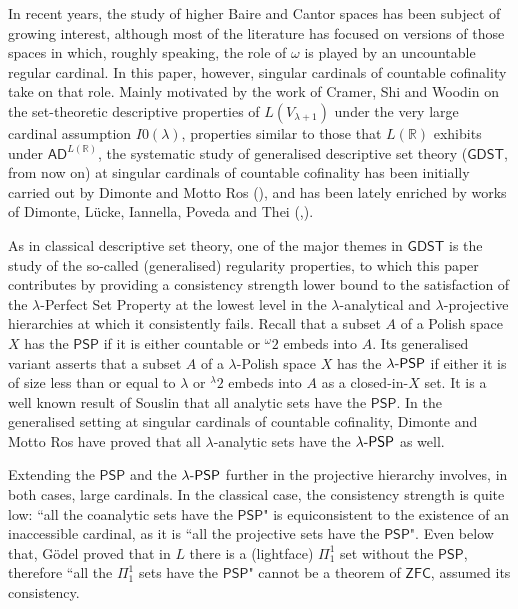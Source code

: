 \documentclass{amsart}
\numberwithin{equation}{section}
\def\hyp{{\hbox{-}}}
\theoremstyle{definition}
\theoremstyle{remark}
\begin{document}
    In recent years, the study of higher Baire and Cantor spaces has been subject of growing interest, although most of the literature has focused on versions of those spaces in which, roughly speaking, the role of $\omega$ is played by an uncountable regular cardinal. In this paper, however, singular cardinals of countable cofinality take on that role. Mainly motivated by the work of Cramer, Shi and Woodin on the set-theoretic descriptive properties of $L(V_{\lambda+1})$ under the very large cardinal assumption $I0(\lambda)$, properties similar to those that $L(\mathbb{R})$ exhibits under $\mathsf{AD}^{L(\mathbb{R})}$, the systematic study of generalised descriptive set theory ($\mathsf{GDST}$, from now on) at singular cardinals of countable cofinality has been initially carried out by Dimonte and Motto Ros (\cite{DMR}), and has been lately enriched by works of Dimonte, Lücke, Iannella, Poveda and Thei (\cite{dimonte2023descriptive},\cite{dimonte2024baire}). 
    
    As in classical descriptive set theory, one of the major themes in $\mathsf{GDST}$ is the study of the so-called (generalised) regularity properties, to which this paper contributes by providing a consistency strength lower bound to the satisfaction of the $\lambda$-Perfect Set Property at the lowest level in the $\lambda$-analytical and $\lambda$-projective hierarchies at which it consistently fails. Recall that a subset $A$ of a Polish space $X$ has the $\mathsf{PSP}$ if it is either countable or ${}^{\omega}2$ embeds into $A$. Its generalised variant asserts that a subset $A$ of a $\lambda$-Polish space $X$ has the $\lambda\hyp\mathsf{PSP}$ if either it is of size less than or equal to $\lambda$ or ${}^{\lambda}2$ embeds into $A$ as a closed-in-$X$ set. It is a well known result of Souslin that all analytic sets have the $\mathsf{PSP}$. In the generalised setting at singular cardinals of countable cofinality, Dimonte and Motto Ros have proved that all $\lambda$-analytic sets have the $\lambda\hyp\mathsf{PSP}$ as well. 
    
    Extending the $\mathsf{PSP}$ and the $\lambda\hyp\mathsf{PSP}$ further in the projective hierarchy involves, in both cases, large cardinals. In the classical case, the consistency strength is quite low: ``all the coanalytic sets have the $\mathsf{PSP}$" is equiconsistent to the existence of an inaccessible cardinal, as it is ``all the projective sets have the $\mathsf{PSP}$". Even below that, G\"{o}del proved that in $L$ there is a (lightface) $\Pi^1_1$ set without the $\mathsf{PSP}$, therefore ``all the $\Pi^1_1$ sets have the $\mathsf{PSP}$" cannot be a theorem of $\mathsf{ZFC}$, assumed its consistency.
    
\end{document}
